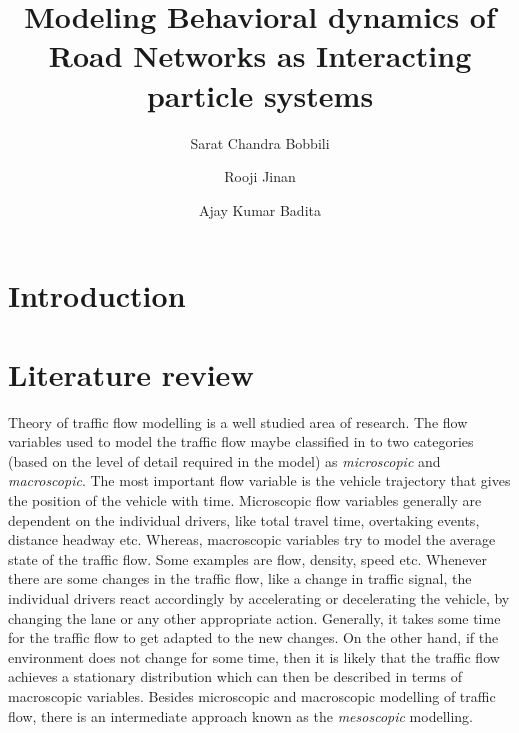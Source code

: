 \documentclass[a4paper,12pt]{scrartcl}
\date{}
\begin{document}
\title{Modeling Behavioral dynamics of Road Networks as Interacting particle systems}
\author{
Sarat Chandra Bobbili\\
\and
Rooji Jinan\\
\and
Ajay Kumar Badita\\
}
\maketitle

\tableofcontents %

\section{Introduction}


\section{Literature review}
Theory of traffic flow modelling is a well studied area of research. The flow variables used to model the traffic flow maybe classified in to two categories (based on the level of detail required in the model) as \emph{microscopic} and \emph{macroscopic}. The most important flow variable is the vehicle trajectory that gives the position of the vehicle with time. Microscopic flow variables generally are dependent on the individual drivers, like total travel time, overtaking events, distance headway etc. Whereas, macroscopic variables try to model the average state of the traffic flow. Some examples are flow, density, speed etc. Whenever there are some changes in the traffic flow, like a change in traffic signal, the individual drivers react accordingly by accelerating or decelerating the vehicle, by changing the lane or any other appropriate action. Generally, it takes some time for the traffic flow to get adapted to the new changes. On the other hand, if the environment does not change for some time, then it is likely that the traffic flow achieves a stationary distribution which can then be described in terms of macroscopic variables. Besides microscopic and macroscopic modelling of traffic flow, there is an intermediate approach known as the \emph{mesoscopic} modelling.
\end{document}
